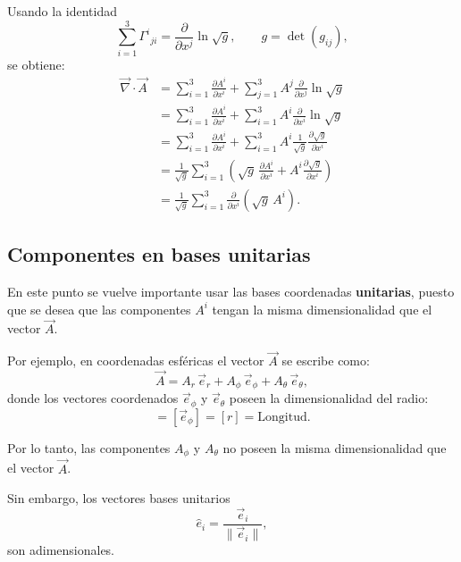 \documentclass[../apunte_mecanica_clasica.tex]{subfiles}%
\begin{document}
Usando la identidad
\begin{equation*}
    \sum_{i=1}^3 \Gamma^i{}_{ji} 
    = \frac{\partial}{\partial x^j} \ln \sqrt{g}, 
    \qquad g = \det(g_{ij}),
\end{equation*}
se obtiene:
\begin{align*}
    \vec{\nabla}\cdot\vec{A} 
    &= \sum_{i=1}^3 \frac{\partial A^i}{\partial x^i}
       + \sum_{j=1}^3 A^j \frac{\partial}{\partial x^j}\ln\sqrt{g} \\[6pt]
    &= \sum_{i=1}^3 \frac{\partial A^i}{\partial x^i}
       + \sum_{i=1}^3 A^i \frac{\partial}{\partial x^i}\ln\sqrt{g} \\[6pt]
    &= \sum_{i=1}^3 \frac{\partial A^i}{\partial x^i}
       + \sum_{i=1}^3 A^i \frac{1}{\sqrt{g}}
          \frac{\partial \sqrt{g}}{\partial x^i} \\[6pt]
    &= \frac{1}{\sqrt{g}} \sum_{i=1}^3 
       \left( \sqrt{g}\,\frac{\partial A^i}{\partial x^i}
            + A^i \frac{\partial \sqrt{g}}{\partial x^i} \right) \\[6pt]
    &= \frac{1}{\sqrt{g}} \sum_{i=1}^3 
       \frac{\partial}{\partial x^i}\!\left(\sqrt{g}\,A^i\right).
\end{align*}


\subsection{Componentes en bases unitarias}

En este punto se vuelve importante usar las bases coordenadas 
\textbf{unitarias}, puesto que se desea que las componentes $A^i$ 
tengan la misma dimensionalidad que el vector $\vec{A}$.  

Por ejemplo, en coordenadas esféricas el vector $\vec{A}$ se escribe como:
\begin{equation*}
    \vec{A} = A_r \,\vec{e}_r + A_\phi \,\vec{e}_\phi + A_\theta \,\vec{e}_\theta,
\end{equation*}
donde los vectores coordenados $\vec{e}_\phi$ y $\vec{e}_\theta$ poseen la 
dimensionalidad del radio:
\begin{equation*}
    [\vec{e}_r] = [\vec{e}_\phi] = [r] = \text{Longitud}.
\end{equation*}

Por lo tanto, las componentes $A_\phi$ y $A_\theta$ no poseen la misma 
dimensionalidad que el vector $\vec{A}$.

Sin embargo, los vectores bases unitarios 
\begin{equation*}
    \hat{e}_i = \frac{\vec{e}_i}{\|\vec{e}_i\|},
\end{equation*}
son adimensionales.  
\end{document}
